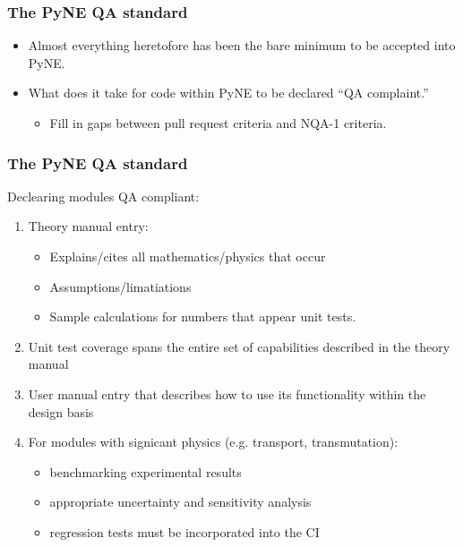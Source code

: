 \documentclass[12pt]{beamer}
\begin{document}
\begin{frame}
\frametitle{The PyNE QA standard}

\begin{itemize}
\item{Almost everything heretofore has been the bare minimum to be accepted into PyNE.}
\item{What does it take for code within PyNE to be declared ``QA complaint.''}
    \begin{itemize}
    \item{Fill in gaps between pull request criteria and NQA-1 criteria.}
    \end{itemize}
\end{itemize}

\end{frame}

\begin{frame}
\frametitle{The PyNE QA standard}

Declearing modules QA compliant:
\begin{enumerate}
\item{Theory manual entry}:
    \begin{itemize}
    \item{Explains/cites all mathematics/physics that occur}
    \item{Assumptions/limatiations}
    \item{Sample calculations for numbers that appear unit tests.}
    \end{itemize}
\item{Unit test coverage spans the entire set of capabilities described in the theory manual}
\item{User manual entry that describes how to use its functionality within the design basis}
\item{For modules with signicant physics (e.g. transport, transmutation):}
    \begin{itemize}
    \item{benchmarking experimental results}
    \item{appropriate uncertainty and sensitivity analysis}
    \item{regression tests must be incorporated into the CI}
    \end{itemize}
\end{enumerate}

\end{frame}
\end{document}
